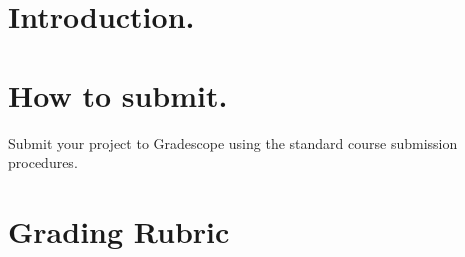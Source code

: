 \documentclass[11pt, letterpaper, onecolumn, oneside, final]{article}
\begin{document}
    \maketitle


    \section{Introduction.}
    

    \section{How to submit.}

    Submit your project to Gradescope using the standard course submission procedures.
    
    \section{Grading Rubric}
\end{document}

